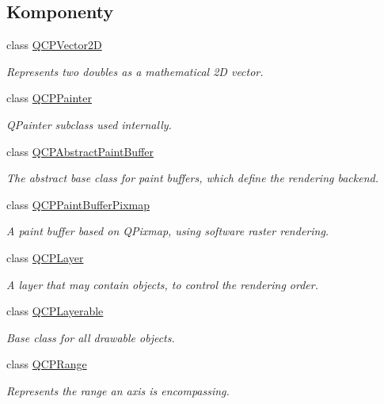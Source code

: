 \subsection*{Komponenty}
\begin{DoxyCompactItemize}
\item 
class \hyperlink{class_q_c_p_vector2_d}{Q\+C\+P\+Vector2D}
\begin{DoxyCompactList}\small\item\em Represents two doubles as a mathematical 2D vector. \end{DoxyCompactList}\item 
class \hyperlink{class_q_c_p_painter}{Q\+C\+P\+Painter}
\begin{DoxyCompactList}\small\item\em Q\+Painter subclass used internally. \end{DoxyCompactList}\item 
class \hyperlink{class_q_c_p_abstract_paint_buffer}{Q\+C\+P\+Abstract\+Paint\+Buffer}
\begin{DoxyCompactList}\small\item\em The abstract base class for paint buffers, which define the rendering backend. \end{DoxyCompactList}\item 
class \hyperlink{class_q_c_p_paint_buffer_pixmap}{Q\+C\+P\+Paint\+Buffer\+Pixmap}
\begin{DoxyCompactList}\small\item\em A paint buffer based on Q\+Pixmap, using software raster rendering. \end{DoxyCompactList}\item 
class \hyperlink{class_q_c_p_layer}{Q\+C\+P\+Layer}
\begin{DoxyCompactList}\small\item\em A layer that may contain objects, to control the rendering order. \end{DoxyCompactList}\item 
class \hyperlink{class_q_c_p_layerable}{Q\+C\+P\+Layerable}
\begin{DoxyCompactList}\small\item\em Base class for all drawable objects. \end{DoxyCompactList}\item 
class \hyperlink{class_q_c_p_range}{Q\+C\+P\+Range}
\begin{DoxyCompactList}\small\item\em Represents the range an axis is encompassing. \end{DoxyCompactList}\item 

\end{DoxyCompactItemize}
